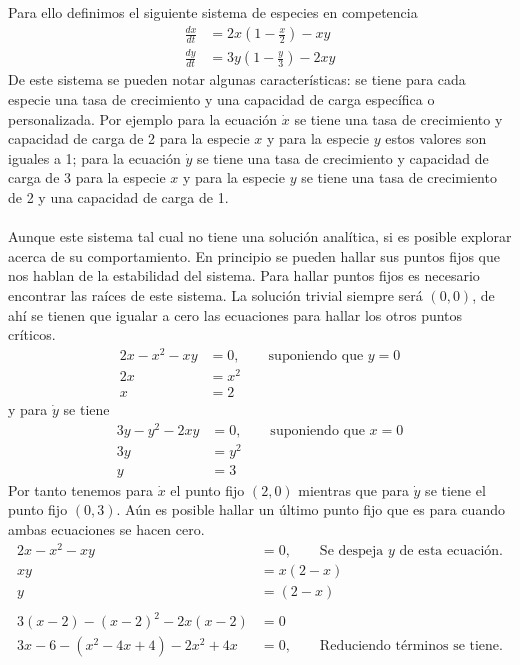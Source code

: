 \begin{ejemplo}
	Para ello definimos el siguiente sistema de especies en competencia
	\begin{align*}
		\frac{dx}{dt}&=2x\left(1-\frac{x}{2}\right)-xy\\
		\frac{dy}{dt}&=3y\left(1-\frac{y}{3}\right)-2xy
	\end{align*}
	De este sistema se pueden notar algunas características: se tiene para cada especie una tasa de crecimiento y una capacidad de carga específica o personalizada. Por ejemplo para la ecuación $\dot{x}$ se tiene una tasa de crecimiento y capacidad de carga de 2 para la especie $x$ y para la especie $y$ estos valores son iguales a 1; para la ecuación $\dot{y}$ se tiene una tasa de crecimiento y capacidad de carga de 3 para la especie $x$ y para la especie $y$ se tiene una tasa de crecimiento de 2 y una capacidad de carga de 1. \\
	\\
	Aunque este sistema tal cual no tiene una solución analítica, si es posible explorar acerca de su comportamiento. En principio se pueden hallar sus puntos fijos que nos hablan de la estabilidad del sistema. Para hallar puntos fijos es necesario encontrar las raíces de este sistema. La solución trivial siempre será $(0,0)$, de ahí se tienen que igualar a cero las ecuaciones para hallar los otros puntos críticos.
	\begin{align*}
		2x-x^2-xy &= 0,\qquad\text{suponiendo que $y = 0$}\\
		2x &= x^2\\
		x&=2
	\end{align*}
	y para $\dot{y}$ se tiene
	\begin{align*}
		3y-y^2-2xy&=0,\qquad\text{suponiendo que $x=0$}\\
		3y &= y^2\\
		y &= 3
	\end{align*}
	Por tanto tenemos para $\dot{x}$ el punto fijo $(2,0)$ mientras que para $\dot{y}$ se tiene el punto fijo $(0,3)$. Aún es posible hallar un último punto fijo que es para cuando ambas ecuaciones se hacen cero.
	\begin{align*}
		2x-x^2-xy&=0,\qquad\text{Se despeja $y$ de esta ecuación.}\\
		xy &= x(2-x)\\
		y &= (2-x)\\
		\\
		3(x-2)-(x-2)^2-2x(x-2) &= 0\\
		3x-6-(x^2-4x+4)-2x^2+4x&=0,\qquad\text{Reduciendo términos se tiene.}\\

\end{align*}
\end{ejemplo}
